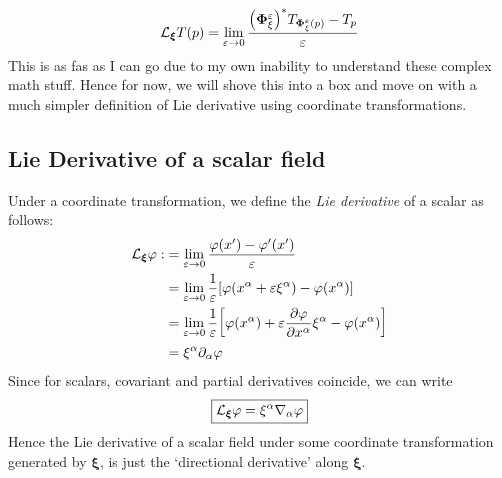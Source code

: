 \begin{align*}
    \mathcal L_{\boldsymbol{\xi}} T(p) = \lim\limits_{\varepsilon\to 0} \frac{\qty(\boldsymbol{\Phi}^\varepsilon_\xi)^* T_{\boldsymbol{\Phi}^\varepsilon_\xi(p)} - T_p}{\varepsilon}
\end{align*}
This is as fas as I can go due to my own inability to understand these complex math stuff. Hence for now, we will shove this into a box and move on with a much simpler definition of Lie derivative using coordinate transformations. 
\subsection{Lie Derivative of a scalar field}
Under a coordinate transformation, we define the \textit{Lie derivative} of a scalar as follows:
\begin{align*}
    \mathcal L_{\boldsymbol{\xi}}\varphi :&= \lim\limits_{\varepsilon\to 0} \frac{\varphi(x')-\varphi'(x')}{\varepsilon}\\
    &=\lim\limits_{\varepsilon\to 0}\frac{1}{\varepsilon}\qty[\varphi(x^\alpha + \varepsilon \xi^\alpha)-\varphi(x^\alpha)]\\
    &=\lim\limits_{\varepsilon\to 0}\frac{1}{\varepsilon}\qty[\varphi(x^\alpha) + \varepsilon\pdv{\varphi}{x^\alpha} \xi^\alpha-\varphi(x^\alpha)]\\
    &=\xi^\alpha \partial_\alpha \varphi
\end{align*}
Since for scalars, covariant and partial derivatives coincide, we can write 
$$\boxed{\mathcal L_{\boldsymbol{\xi}}\varphi = \xi^\alpha \nabla_{\alpha} \varphi}$$
Hence the Lie derivative of a scalar field under some coordinate transformation generated by $\boldsymbol{\xi}$, is just the `directional derivative' along $\boldsymbol{\xi}$. 
